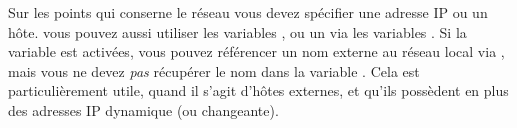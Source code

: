   Sur les points qui conserne le réseau vous devez spécifier une adresse IP
  ou un hôte. vous pouvez aussi utiliser les variables ,
   ou un  via les variables .
  Si la variable  est activées, vous pouvez référencer un nom
  externe au réseau local via , mais vous ne devez \emph{pas}
  récupérer le nom dans la variable . Cela est particulièrement
  utile, quand il s'agit d'hôtes externes, et qu'ils possèdent en plus des
  adresses IP dynamique (ou changeante).


